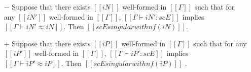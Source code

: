 \begin{lemma}
    \label{lemma:entry-singularity-completeness}
    \hfill
    \begin{itemize}
        \item [$-$] Suppose that there exists $[[iN]]$ well-formed in $[[Γ]]$ 
            such that for any $[[iN']]$ well-formed in $[[Γ]]$,
            $[[Γ ⊢ iN' : scE]]$ implies $[[Γ ⊢ iN' ≈ iN]]$. 
            Then $[[scE singular with nf(iN)]]$.
        \item [$+$] Suppose that there exists $[[iP]]$ well-formed in $[[Γ]]$ 
            such that for any $[[iP']]$ well-formed in $[[Γ]]$,
            $[[Γ ⊢ iP' : scE]]$ implies $[[Γ ⊢ iP' ≈ iP]]$. 
            Then $[[scE singular with nf(iP)]]$ .
    \end{itemize}
\end{lemma}
